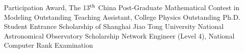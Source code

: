 \documentclass{resume}
\begin{document}
\begin{entries}
    {Participation Award,
      The 13$^{\rm th}$ China Post-Graduate Mathematical Contest in Modeling}
    {Outstanding Teaching Assistant, College Physics}
    {Outstanding Ph.D. Student Entrance Scholarship of Shanghai Jiao Tong University}
    {National Astronomical Observatory Scholarship}
    {Network Engineer (Level 4), National Computer Rank Examination}
\end{entries}
\end{document}
